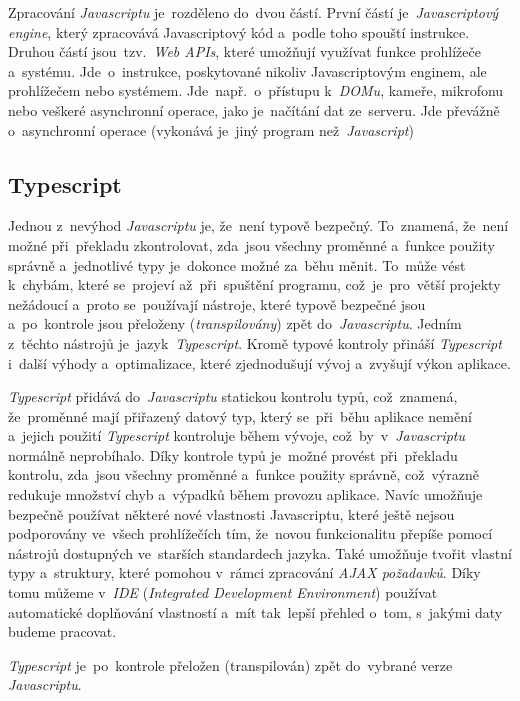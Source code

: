 \documentclass[10pt,a4paper]{article}
\begin{document}
        Zpracování \emph{Javascriptu} je~rozděleno do~dvou částí. První částí je~\emph{Javascriptový engine}, který zpracovává Javascriptový kód a~podle toho spouští instrukce. Druhou částí jsou~tzv.~\emph{Web APIs}, které umožňují využívat funkce prohlížeče a~systému. Jde~o~instrukce, poskytované nikoliv Javascriptovým enginem, ale prohlížečem nebo systémem. Jde~např.~o~přístupu k~\emph{DOMu}, kameře, mikrofonu nebo veškeré asynchronní operace, jako je~načítání dat ze~serveru. Jde převážně o~asynchronní operace (vykonává je~jiný program než~\emph{Javascript}) \cite{kantor_javascript}

        \subsection{Typescript}
        Jednou z~nevýhod \emph{Javascriptu} je, že~není typově bezpečný. To~znamená, že~není možné při~překladu zkontrolovat, zda~jsou všechny proměnné a~funkce použity správně a~jednotlivé typy je~dokonce možné za~běhu měnit. To~může vést k~chybám, které se~projeví až~při~spuštění programu, což~je~pro~větší projekty nežádoucí a~proto se~používají nástroje, které typově bezpečné jsou a~po~kontrole jsou přeloženy (\emph{transpilovány}) zpět do~\emph{Javascriptu}. Jedním z~těchto nástrojů je~jazyk~\emph{Typescript}. Kromě typové kontroly přináší \emph{Typescript} i~další výhody a~optimalizace, které zjednodušují vývoj a~zvyšují výkon aplikace.

        \emph{Typescript} přidává do~\emph{Javascriptu} statickou kontrolu typů, což~znamená, že~proměnné mají přiřazený datový typ, který se~při~běhu aplikace nemění a~jejich použití \emph{Typescript} kontroluje během vývoje, což~by~v~\emph{Javascriptu} normálně neprobíhalo. Díky kontrole typů je~možné provést při~překladu kontrolu, zda~jsou všechny proměnné a~funkce použity správně, což~výrazně redukuje množství chyb a~výpadků během provozu aplikace. Navíc umožňuje bezpečně používat některé nové vlastnosti Javascriptu, které ještě nejsou podporovány ve~všech prohlížečích tím, že~novou funkcionalitu přepíše pomocí nástrojů dostupných ve~starších standardech jazyka. Také umožňuje tvořit vlastní typy a~struktury, které pomohou v~rámci zpracování \emph{AJAX požadavků}. Díky tomu můžeme v~\emph{IDE} (\emph{Integrated Development Environment}) používat automatické doplňování vlastností a~mít tak~lepší přehled o~tom, s~jakými daty budeme pracovat.

        \emph{Typescript} je~po~kontrole přeložen (transpilován) zpět do~vybrané verze \emph{Javascriptu}. \cite[Get started/TypeScript for the New Programmer]{TypeScript}
\end{document}
